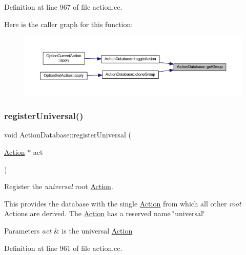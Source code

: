 Definition at line 967 of file action.\+cc.

Here is the caller graph for this function\+:
\nopagebreak
\begin{figure}[H]
\begin{center}
\leavevmode
\includegraphics[width=350pt]{class_action_database_ad8f31b8112d7da028a3091e176151f14_icgraph}
\end{center}
\end{figure}
\mbox{\label{class_action_database_a6793eb1aba4974cf863c3818f57a1bdd}} 
\subsubsection{\texorpdfstring{registerUniversal()}{registerUniversal()}}
{\footnotesize\ttfamily void Action\+Database\+::register\+Universal (\begin{DoxyParamCaption}\item[{\mbox{\hyperlink{class_action}{Action}} $\ast$}]{act }\end{DoxyParamCaption})}



Register the {\itshape universal} root \mbox{\hyperlink{class_action}{Action}}. 

This provides the database with the single \mbox{\hyperlink{class_action}{Action}} from which all other {\itshape root} Actions are derived. The \mbox{\hyperlink{class_action}{Action}} has a reserved name \char`\"{}universal\char`\"{} 
\begin{DoxyParams}{Parameters}
{\em act} & is the universal \mbox{\hyperlink{class_action}{Action}} \\
\hline
\end{DoxyParams}


Definition at line 961 of file action.\+cc.

